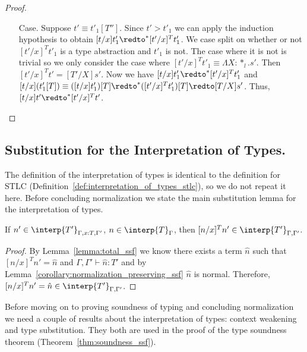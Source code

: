 \begin{proof}
\begin{itemize}
\item[Case.] Suppose $t' \equiv t'_1[T'']$.
  Since $t' > t'_1$ we can apply the induction hypothesis to
  obtain $[t/x] t'_1 \redto^* [t'/x]^T t'_1$.  We case split on whether or not $[t'/x]^T t'_1$ is
  a type abstraction and $t'_1$ is not.  The case where it is not is trivial so we only consider
  the case where $[t'/x]^T t'_1 \equiv \Lambda X:*_l.s'$.  Then 
  $[t'/x]^T t'  = [T'/X]s'$.  Now we have $[t/x] t'_1 \redto^* [t'/x]^T t'_1$ and
  $[t/x](t'_1[T]) \equiv ([t/x]t'_1)[T] \redto^* ([t'/x]^T t'_1)[T] \redto [T/X]s'$.  Thus,
  $[t/x]t' \redto^* [t'/x]^T t'$.  
\end{itemize}
\end{proof}

\subsection{Substitution for the Interpretation of Types.}
\label{subsec:substitution_for_the_interpretation_of_types_ssf}
The definition of the interpretation of types is identical to the
definition for STLC (Definition~\ref{def:interpretation_of_types_stlc}),
so we do not repeat it here.  Before concluding normalization we state
the main substitution lemma for the interpretation of types.
\begin{lemma}
  If $n' \in \interp{T'}_{\Gamma,x:T,\Gamma'}$, $n \in \interp{T}_\Gamma$, then 
  $[n/x]^T n' \in \interp{T'}_{\Gamma,\Gamma'}$.
  
  \label{lemma:interpretation_of_types_closed_substitution_ssf}
\end{lemma}
\begin{proof}
  By Lemma~\ref{lemma:total_ssf} we know there exists a term $\hat{n}$ 
  such that $[n/x]^T n' = \hat{n}$ and $\Gamma,\Gamma' \vdash \hat{n}:T'$ and by 
  Lemma~\ref{corollary:normalization_preserving_ssf} $\hat{n}$ is normal.  Therefore,
  $[n/x]^T n' = \hat{n} \in \interp{T'}_{\Gamma,\Gamma'}$.
\end{proof}

Before moving on to proving soundness of typing and concluding
normalization we need a couple of results about the interpretation of
types: context weakening and type substitution.  They both are used in
the proof of the type soundness theorem
(Theorem~\ref{thm:soundness_ssf}).

